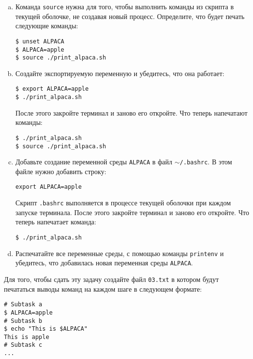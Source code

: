 \documentclass{article}
\begin{document}
\begin{enumerate}[(a)]
\item Команда \texttt{source} нужна для того, чтобы выполнить команды из скрипта в текущей оболочке, не создавая новый процесс. Определите, что будет печать следующие команды:
\begin{lstlisting}
$ unset ALPACA
$ ALPACA=apple
$ source ./print_alpaca.sh
\end{lstlisting}

\item Создайте экспортируемую переменную и убедитесь, что она работает:
\begin{lstlisting}
$ export ALPACA=apple
$ ./print_alpaca.sh
\end{lstlisting}
После этого закройте терминал и заново его откройте. Что теперь напечатают команды:
\begin{lstlisting}
$ ./print_alpaca.sh
$ source ./print_alpaca.sh
\end{lstlisting}

\item Добавьте создание переменной среды \texttt{ALPACA} в файл \texttt{$\sim$/.bashrc}. В этом файле нужно добавить строку:
\begin{lstlisting}
export ALPACA=apple
\end{lstlisting}
Скрипт \texttt{.bashrc} выполняется в процессе текущей оболочки при каждом запуске терминала. После этого закройте терминал и заново его откройте. Что теперь напечатает команда:
\begin{lstlisting}
$ ./print_alpaca.sh
\end{lstlisting}

\item Распечатайте все переменные среды, с помощью команды \texttt{printenv} и убедитесь, что добавилась новая переменная среды \texttt{ALPACA}.
\end{enumerate}
Для того, чтобы сдать эту задачу создайте файл \texttt{03.txt} в котором будут печататься выводы команд на каждом шаге в следующем формате:
\begin{lstlisting}
# Subtask a
$ ALPACA=apple
# Subtask b
$ echo "This is $ALPACA"
This is apple
# Subtask c
...
\end{lstlisting}
\end{document}
